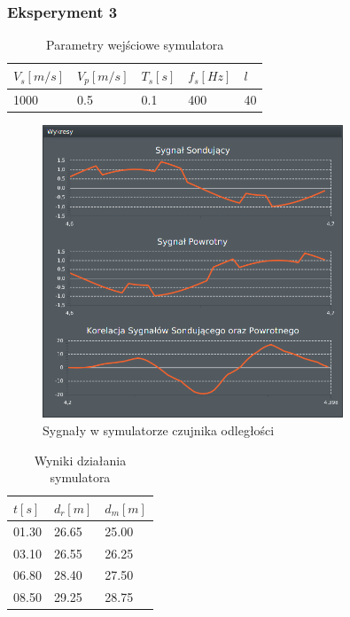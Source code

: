\documentclass[12pt]{article}
\begin{document}
{{            \subsubsection{Eksperyment 3} {
                \begin{table}[H]
                    \centering
                    \begin{tabular}{|l|l|l|l|l|}
                        \hline
                        $V_s[m/s]$ & $V_p[m/s]$ & $T_s[s]$ & $f_s[Hz]$ & $l$ \\ \hline
                        1000       & 0.5        & 0.1      & 400       & 40 \\ \hline
                    \end{tabular}
                    \caption{Parametry wejściowe symulatora}
                \end{table}
                \begin{figure}[H]
                    \centering
                    \includegraphics[width=0.8\textwidth]{img/result/simulation/experiment3.png}
                    \caption{Sygnały w symulatorze czujnika odległości}
                \end{figure}
                \begin{table}[H]
                    \centering
                    \begin{tabular}{|l|l|l|}
                        \hline
                        $t[s]$ & $d_r[m]$ & $d_m[m]$ \\ \hline
                        01.30  & 26.65    & 25.00    \\ \hline
                        03.10  & 26.55    & 26.25    \\ \hline
                        06.80  & 28.40    & 27.50    \\ \hline
                        08.50  & 29.25    & 28.75    \\ \hline
                    \end{tabular}
                    \caption{Wyniki działania symulatora}
                \end{table}
            }
            \newpage

}}
\end{document}
